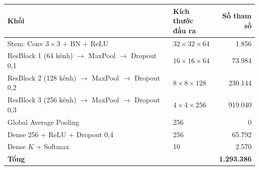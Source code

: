 \begin{tabular}{llr}
\toprule
Khối & \makecell[l]{Kích thước\\đầu ra} & \makecell[r]{Số tham\\số} \\
\midrule
Stem: Conv $3{\times}3$ + BN + ReLU & $32\times32\times64$ & 1{.}856 \\
ResBlock 1 (64 kênh) $\to$ MaxPool $\to$ Dropout 0{,}1 & $16\times16\times64$ & 73{.}984 \\
ResBlock 2 (128 kênh) $\to$ MaxPool $\to$ Dropout 0{,}2 & $8\times8\times128$ & 230{.}144 \\
ResBlock 3 (256 kênh) $\to$ MaxPool $\to$ Dropout 0{,}3 & $4\times4\times256$ & 919{.}040 \\
Global Average Pooling & 256 & 0 \\
Dense 256 + ReLU + Dropout 0,4 & 256 & 65{.}792 \\
Dense $K$ + Softmax & 10 & 2{.}570 \\
\midrule
\textbf{Tổng} &  & \textbf{1{.}293{.}386} \\
\bottomrule
\end{tabular}
